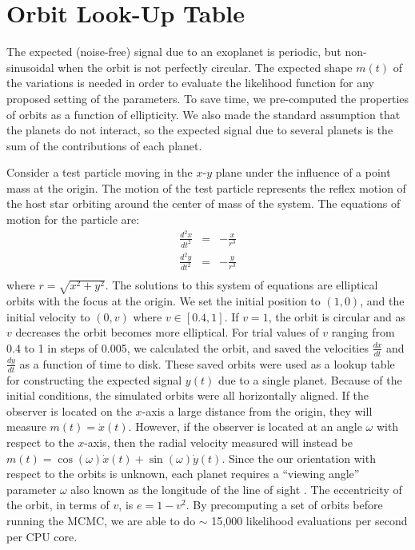 \documentclass[useAMS,usenatbib]{mn2e}
\begin{document}
\section{Orbit Look-Up Table}\label{sec:orbits}
The expected (noise-free) signal due to an exoplanet is periodic, but
non-sinusoidal when the orbit is not perfectly circular. The expected
shape $m(t)$ of the variations is needed in order to evaluate the likelihood
function for any proposed setting of the parameters.
To save time, we pre-computed the properties of orbits as a function of
ellipticity. We also made the standard assumption that the planets do not
interact, so the expected signal due to several planets is the sum of the
contributions of each planet.

Consider a test particle moving in the $x$-$y$ plane under the influence of a
point mass at the origin. The motion of the test particle represents the
reflex motion of the host star orbiting around the center of mass of the
system. The equations of motion for the particle are:
\begin{eqnarray}
\frac{d^2x}{dt^2} &=& -\frac{x}{r^3} \\
\frac{d^2y}{dt^2} &=& -\frac{y}{r^3} \\
\end{eqnarray}
where $r = \sqrt{x^2 + y^2}$. The solutions to this system of equations are elliptical orbits
with the focus at the origin. We set the initial position to $(1, 0)$, and
the initial velocity to $(0, v)$ where $v \in [0.4, 1]$.
If $v=1$, the orbit is circular and as $v$ decreases the orbit becomes more
elliptical. For trial values of $v$ ranging from 0.4 to 1 in steps of 0.005,
we calculated the orbit, and saved the
velocities $\frac{dx}{dt}$ and $\frac{dy}{dt}$ as a function of time to disk.
These saved orbits were used as a lookup table for constructing the expected
signal $y(t)$ due to a single planet.
Because of the initial conditions, the simulated orbits were all horizontally
aligned. If the observer is located on the $x$-axis a large distance
from the origin, they will measure $m(t) = \dot{x}(t)$. However, if the
observer is located at an angle $\omega$ with respect to the $x$-axis, then
the radial velocity measured will instead be
$m(t) = \cos(\omega)\dot{x}(t) + \sin(\omega)\dot{y}(t)$.
Since the our orientation with respect to the orbits is unknown, each planet
requires a ``viewing angle'' parameter $\omega$ also known as the longitude
of the line of sight \citep{ohta}.
The eccentricity of the orbit, in terms of $v$, is $e = 1 - v^2$.
By precomputing a set of orbits before running the MCMC, we are able to
do $\sim$ 15,000 likelihood evaluations per second per CPU core.
\end{document}
